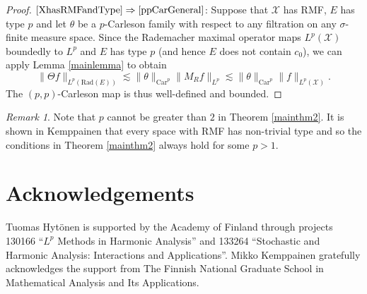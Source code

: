 \documentclass[a4paper,10pt]{amsart}
\theoremstyle{plain}
\theoremstyle{definition}
\theoremstyle{remark}
\newtheorem*{remark}{Remark}
\begin{document}
\begin{proof}
    

     $\eqref{XhasRMFandType}\Rightarrow\eqref{ppCarGeneral}$:
    Suppose that $\mathcal{X}$ has RMF, $E$ has type $p$ and let $\theta$ be a 
    $p$-Carleson family with respect to any filtration on any $\sigma$-finite measure space. 
    Since the Rademacher maximal operator maps $L^p(\mathcal{X})$
    boundedly to $L^p$ and $E$ has type $p$ (and hence $E$ does not contain $c_0$), we can apply Lemma \ref{mainlemma} to obtain
    \begin{equation*}
      \| \Theta f \|_{L^p(\text{Rad}(E))}
      \lesssim \| \theta \|_{\text{Car}^p} \| M_Rf \|_{L^p}
      \lesssim \| \theta \|_{\text{Car}^p} \| f \|_{L^p(\mathcal{X})} .
    \end{equation*}
    The $(p,p)$-Carleson map is thus well-defined and bounded.
  \end{proof}

\begin{remark}
Note that $p$ cannot be greater than $2$ in Theorem \ref{mainthm2}. It is shown in Kemppainen \cite{RMF}
that every space with RMF has non-trivial type and so the conditions in Theorem \ref{mainthm2} always hold
for some $p > 1$.
\end{remark}

\section*{Acknowledgements}

Tuomas Hyt\"onen is supported by the Academy of Finland through projects 130166 ``$L^p$ Methods in Harmonic Analysis'' and 133264 ``Stochastic and Harmonic Analysis: Interactions and Applications''.
Mikko Kemppainen gratefully acknowledges the support from The Finnish National Graduate School in Mathematical Analysis and Its Applications.



\end{document}
